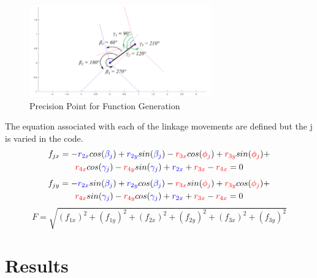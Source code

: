 \documentclass[12pt]{article}
\begin{document}
\begin{figure}[h!]
    \centering
    \includegraphics[width=0.7\textwidth]{func_gen.png}
    \caption{Precision Point for Function Generation}
    \label{fig:precisionpoint_FG}
\end{figure}
The equation associated with each of the linkage movements are defined but the j is varied in the code.
\begin{multline}
    f_{jx}=-\color{blue}r_{2x}\color{black}cos(\color{blue}\beta_j\color{black})+\color{blue}r_{2y}\color{black}sin(\color{blue}\beta_j\color{black})-\color{red}r_{3x}\color{black}cos(\color{red}\phi_{j}\color{black})+\color{red}r_{3y}\color{black}sin(\color{red}\phi_j\color{black})+\\\color{red}r_{4x}\color{black}cos(\color{blue}\gamma_{j}\color{black})-\color{red}r_{4y}\color{black}sin(\color{blue}\gamma_{j}\color{black})+\color{blue}r_{2x}\color{black}+\color{red}r_{3x}\color{black}-\color{red}r_{4x}\color{black}=0
\end{multline}
\begin{multline}
    f_{jy}=-\color{blue}r_{2x}\color{black}sin(\color{blue}\beta_j\color{black})+\color{blue}r_{2y}\color{black}cos(\color{blue}\beta_j\color{black})-\color{red}r_{3x}\color{black}sin(\color{red}\phi_{j}\color{black})+\color{red}r_{3y}\color{black}cos(\color{red}\phi_j\color{black})+\\\color{red}r_{4x}\color{black}sin(\color{blue}\gamma_{j}\color{black})-\color{red}r_{4y}\color{black}cos(\color{blue}\gamma_{j}\color{black})+\color{blue}r_{2x}\color{black}+\color{red}r_{3x}\color{black}-\color{red}r_{4x}\color{black}=0
\end{multline}
\begin{equation}
        F=\sqrt{(f_{1x})^2+(f_{1y})^2+(f_{2x})^2+(f_{2y})^2+(f_{3x})^2+(f_{3y})^2}
\end{equation}

\pagebreak
\section{Results}
\end{document}
